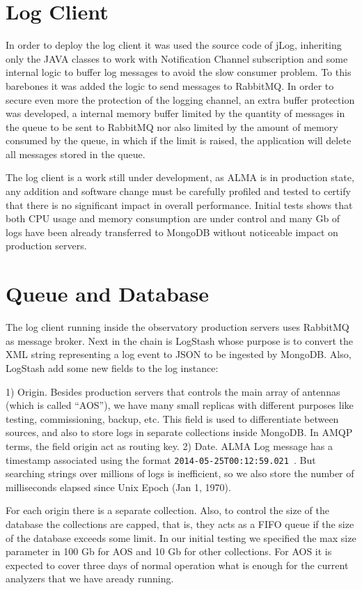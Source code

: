 \documentclass[]{spie}  %
\begin{document}
\section{Log Client}
In order to deploy the log client it was used the source code of jLog,
   inheriting only the JAVA classes to work with Notification Channel
   subscription and some internal logic to buffer log messages to avoid the
   slow consumer problem\cite{mora2012alma}. To this barebones it was
   added the logic to send messages to RabbitMQ. In order to secure even more
   the protection of the logging channel, an extra buffer protection was
   developed, a internal memory buffer limited by the quantity of messages in
   the queue to be sent to RabbitMQ nor also limited by the amount of memory
   consumed by the queue, in which if the limit is raised, the application will
   delete all messages stored in the queue.

The log client is a work still under development, as ALMA is in production
state, any addition and software change must be carefully profiled and tested
to certify that there is no significant impact in overall performance. Initial
tests shows that both CPU usage and memory consumption are under control and
many Gb of logs have been already transferred to MongoDB without noticeable
impact on production servers.

\section{Queue and Database}
The log client running inside the observatory production servers uses RabbitMQ
as message broker. Next in the chain is LogStash\cite{LogStash} whose purpose is to
convert the XML string representing a log event to JSON to be ingested by
MongoDB. Also, LogStash add some new fields to the log instance:

1)  Origin. Besides production servers that controls the main array of antennas
(which is called ``AOS''), we have many small replicas with different
purposes like testing, commissioning, backup, etc. This field is used to
differentiate between sources, and also to store logs in separate collections
inside MongoDB. In AMQP terms\cite{AMQP}, the field origin act as routing key.  2)
Date. ALMA Log message has a timestamp associated using the format
{\tt 2014-05-25T00:12:59.021 }. But searching strings over millions of logs
is inefficient, so we also store the number of milliseconds elapsed since Unix
Epoch (Jan 1, 1970).

For each origin there is a separate collection. Also, to control the size of
the database the collections are capped, that is, they acts as a FIFO queue if
the size of the database exceeds some limit. In our initial testing we
specified the max size parameter in 100 Gb for AOS and 10 Gb for other
collections. For AOS it is expected to cover three days of normal operation
what is enough for the current analyzers that we have aready running.
\end{document}
